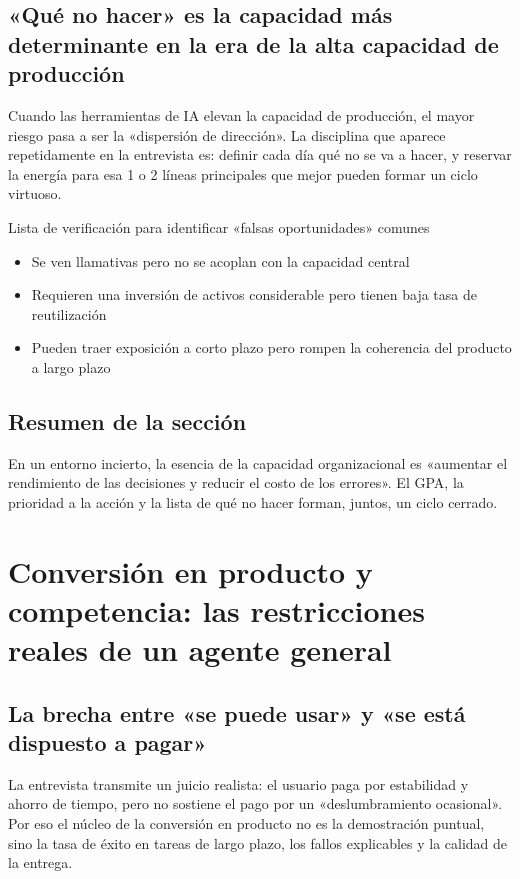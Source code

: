 \documentclass[a4paper]{article}
\begin{document}
\subsection{«Qué no hacer» es la capacidad más determinante en la era de la alta capacidad de producción}

Cuando las herramientas de IA elevan la capacidad de producción, el mayor riesgo pasa a ser la «dispersión de dirección». La disciplina que aparece repetidamente en la entrevista es: definir cada día qué no se va a hacer, y reservar la energía para esa 1 o 2 líneas principales que mejor pueden formar un ciclo virtuoso.

\begin{knowledgebox}{Lista de verificación para identificar «falsas oportunidades» comunes}
\begin{itemize}
    \item Se ven llamativas pero no se acoplan con la capacidad central
    \item Requieren una inversión de activos considerable pero tienen baja tasa de reutilización
    \item Pueden traer exposición a corto plazo pero rompen la coherencia del producto a largo plazo
\end{itemize}
\end{knowledgebox}

\subsection{Resumen de la sección}

En un entorno incierto, la esencia de la capacidad organizacional es «aumentar el rendimiento de las decisiones y reducir el costo de los errores». El GPA, la prioridad a la acción y la lista de qué no hacer forman, juntos, un ciclo cerrado.

\section{Conversión en producto y competencia: las restricciones reales de un agente general}

\subsection{La brecha entre «se puede usar» y «se está dispuesto a pagar»}

La entrevista transmite un juicio realista: el usuario paga por estabilidad y ahorro de tiempo, pero no sostiene el pago por un «deslumbramiento ocasional». Por eso el núcleo de la conversión en producto no es la demostración puntual, sino la tasa de éxito en tareas de largo plazo, los fallos explicables y la calidad de la entrega.
\end{document}
